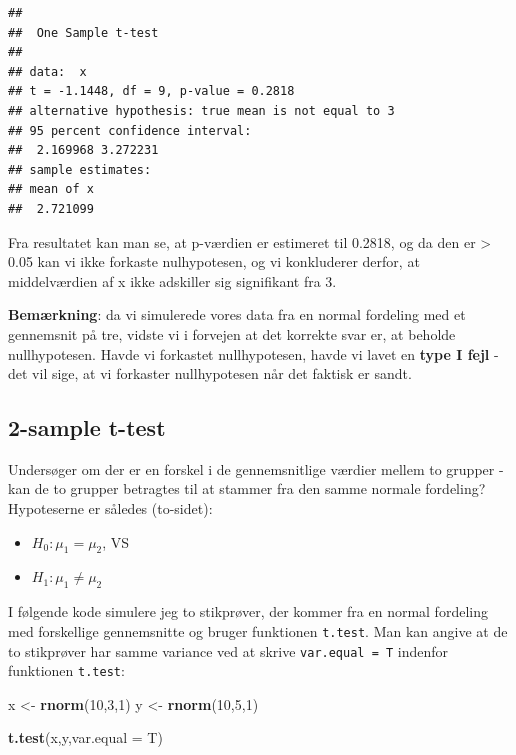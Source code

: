 \documentclass[
]{book}
\newenvironment{Shaded}{\begin{snugshade}}{\end{snugshade}}
\newcommand{\AttributeTok}[1]{\textcolor[rgb]{0.13,0.29,0.53}{#1}}
\newcommand{\DecValTok}[1]{\textcolor[rgb]{0.00,0.00,0.81}{#1}}
\newcommand{\FunctionTok}[1]{\textcolor[rgb]{0.13,0.29,0.53}{\textbf{#1}}}
\newcommand{\NormalTok}[1]{#1}
\newcommand{\OtherTok}[1]{\textcolor[rgb]{0.56,0.35,0.01}{#1}}
\providecommand{\tightlist}{%
  \setlength{\itemsep}{0pt}\setlength{\parskip}{0pt}}
\theoremstyle{definition}
\theoremstyle{definition}
\theoremstyle{definition}
\theoremstyle{definition}
\theoremstyle{remark}
\begin{document}
\begin{verbatim}
## 
##  One Sample t-test
## 
## data:  x
## t = -1.1448, df = 9, p-value = 0.2818
## alternative hypothesis: true mean is not equal to 3
## 95 percent confidence interval:
##  2.169968 3.272231
## sample estimates:
## mean of x 
##  2.721099
\end{verbatim}

Fra resultatet kan man se, at p-værdien er estimeret til 0.2818, og da den er \textgreater{} 0.05 kan vi ikke forkaste nulhypotesen, og vi konkluderer derfor, at middelværdien af x ikke adskiller sig signifikant fra 3.

\textbf{Bemærkning}: da vi simulerede vores data fra en normal fordeling med et gennemsnit på tre, vidste vi i forvejen at det korrekte svar er, at beholde nullhypotesen. Havde vi forkastet nullhypotesen, havde vi lavet en \textbf{type I fejl} - det vil sige, at vi forkaster nullhypotesen når det faktisk er sandt.

\subsection{2-sample t-test}\label{sample-t-test-1}

Undersøger om der er en forskel i de gennemsnitlige værdier mellem to grupper - kan de to grupper betragtes til at stammer fra den samme normale fordeling? Hypoteserne er således (to-sidet):

\begin{itemize}
\tightlist
\item
  \(H_{0}: \mu_{1} = \mu_{2}\), VS
\item
  \(H_{1}: \mu_{1} \neq \mu_{2}\)
\end{itemize}

I følgende kode simulere jeg to stikprøver, der kommer fra en normal fordeling med forskellige gennemsnitte og bruger funktionen \texttt{t.test}. Man kan angive at de to stikprøver har samme variance ved at skrive \texttt{var.equal\ =\ T} indenfor funktionen \texttt{t.test}:

\begin{Shaded}
\begin{Highlighting}[]
\NormalTok{x }\OtherTok{\textless{}{-}} \FunctionTok{rnorm}\NormalTok{(}\DecValTok{10}\NormalTok{,}\DecValTok{3}\NormalTok{,}\DecValTok{1}\NormalTok{)}
\NormalTok{y }\OtherTok{\textless{}{-}} \FunctionTok{rnorm}\NormalTok{(}\DecValTok{10}\NormalTok{,}\DecValTok{5}\NormalTok{,}\DecValTok{1}\NormalTok{)}

\FunctionTok{t.test}\NormalTok{(x,y,}\AttributeTok{var.equal =}\NormalTok{ T)}
\end{Highlighting}
\end{Shaded}
\end{document}
